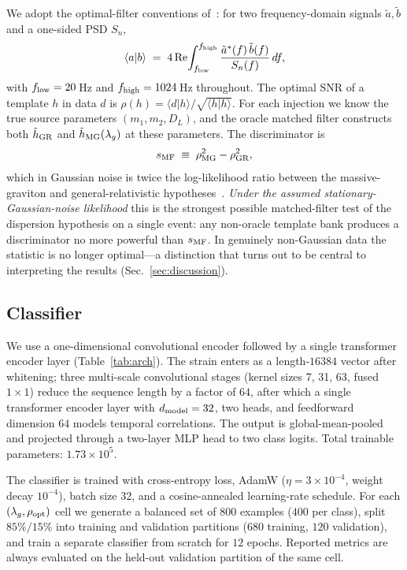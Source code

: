 \documentclass[11pt,a4paper]{article}
\newcommand{\lamg}{\lambda_{g}}
\begin{document}
We adopt the optimal-filter conventions
of~\cite{Allen2012,Cutler1994}: for two frequency-domain signals
$\tilde{a},\tilde{b}$ and a one-sided PSD $S_{n}$,
\begin{equation}
  \langle a|b\rangle \;=\; 4\,\mathrm{Re}\!\int_{f_{\rm low}}^{f_{\rm high}}
  \frac{\tilde{a}^{*}(f)\,\tilde{b}(f)}{S_{n}(f)}\,df,
  \label{eq:innerproduct}
\end{equation}
with $f_{\rm low}=20\,$Hz and $f_{\rm high}=1024\,$Hz throughout. The
optimal SNR of a template $h$ in data $d$ is $\rho(h)=\langle d|h\rangle/\sqrt{\langle h|h\rangle}$.
For each injection we know the true source parameters
$(m_{1},m_{2},D_{L})$, and the oracle matched filter constructs both
$\tilde{h}_{\rm GR}$ and $\tilde{h}_{\rm MG}(\lamg)$ at these
parameters. The discriminator is
\begin{equation}
  s_{\rm MF} \;\equiv\; \rho_{\rm MG}^{2} - \rho_{\rm GR}^{2},
  \label{eq:smf}
\end{equation}
which in Gaussian noise is twice the log-likelihood ratio between the
massive-graviton and general-relativistic hypotheses~\cite{Allen2012}.
\emph{Under the assumed stationary-Gaussian-noise likelihood} this is the
strongest possible matched-filter test of the dispersion hypothesis on a
single event: any non-oracle template bank produces a discriminator no
more powerful than $s_{\rm MF}$. In genuinely non-Gaussian data the
statistic is no longer optimal---a distinction that turns out to be
central to interpreting the results (Sec.~\ref{sec:discussion}).

\subsection{Classifier}\label{sec:classifier}

We use a one-dimensional convolutional encoder followed by a single
transformer encoder layer (Table~\ref{tab:arch}). The strain enters as
a length-$16384$ vector after whitening; three multi-scale convolutional
stages (kernel sizes 7, 31, 63, fused $1\!\times\!1$) reduce the
sequence length by a factor of $64$, after which a single transformer
encoder layer with $d_{\rm model}=32$, two heads, and feedforward
dimension $64$ models temporal correlations. The output is global-mean-pooled
and projected through a two-layer MLP head to two class logits. Total
trainable parameters: $1.73\times 10^{5}$.

The classifier is trained with cross-entropy loss, AdamW
($\eta=3\times 10^{-4}$, weight decay $10^{-4}$), batch size 32, and a
cosine-annealed learning-rate schedule. For each
$(\lamg,\rho_{\rm opt})$ cell we generate a balanced set of $800$
examples ($400$ per class), split $85\%/15\%$ into training and
validation partitions ($680$ training, $120$ validation), and train a
separate classifier from scratch for $12$ epochs. Reported metrics are
always evaluated on the held-out validation partition of the same cell.
\end{document}
